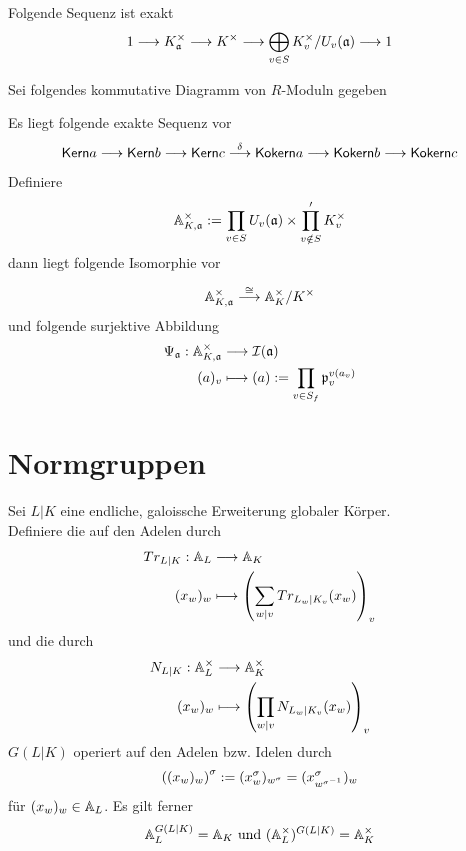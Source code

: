 \Lem{}
Folgende Sequenz ist exakt
\[ 1 \overset{}{\longrightarrow} K_{\mathfrak{a}}^\times \overset{}{\longrightarrow} K^\times \overset{}{\longrightarrow} \bigoplus_{v\in S} K_v^\times/U_v(\mathfrak{a}) \overset{}{\longrightarrow} 1 \]

Sei folgendes kommutative Diagramm von $R$-Moduln gegeben
\begin{center}
\end{center}
Es liegt folgende exakte Sequenz vor
\[ \textsf{Kern} a \overset{}{\longrightarrow} \textsf{Kern} b \overset{}{\longrightarrow} \textsf{Kern} c \overset{\delta}{\longrightarrow} \textsf{Kokern} a \overset{}{\longrightarrow} \textsf{Kokern} b \overset{}{\longrightarrow} \textsf{Kokern} c \]

\Bem{}
Definiere
\[ \mathbb{A}_{K,\mathfrak{a}}^\times := \prod_{v \in S}U_v(\mathfrak{a}) \times \prod'_{v\notin S} K_v^\times \]
dann liegt folgende Isomorphie vor
\[ \mathbb{A}_{K,\mathfrak{a}}^\times \overset{\overset{}{\cong}}{\longrightarrow} \mathbb{A}_K^\times / K^\times \]
und folgende surjektive Abbildung
\begin{align*}
\Psi_{\mathfrak{a}} : \mathbb{A}_{K,\mathfrak{a}}^\times &\overset{}{\longrightarrow} \mathcal{I}(\mathfrak{a})\\
(a)_v & \longmapsto (a) := \prod_{v\in S_f}\mathfrak{p}_v^{v(a_v)}
\end{align*}


\section{Normgruppen}
Sei $L|K$ eine endliche, galoissche Erweiterung globaler Körper.\\
Definiere die  auf den Adelen durch
\begin{align*}
Tr_{L|K} : \mathbb{A}_L & \overset{}{\longrightarrow} \mathbb{A}_K\\
(x_w)_w & \longmapsto \left(\sum_{w |v}Tr_{L_w|K_v}(x_w) \right)_v
\end{align*}
und die  durch
\begin{align*}
N_{L|K} : \mathbb{A}_L^\times & \overset{}{\longrightarrow} \mathbb{A}_K^\times\\
(x_w)_w & \longmapsto \left(\prod_{w |v}N_{L_w|K_v}(x_w) \right)_v
\end{align*}
$G(L|K)$ operiert auf den Adelen bzw. Idelen durch
\[ \left((x_w)_w\right)^\sigma := (x_w^\sigma)_{w^\sigma} = (x_{w^{\sigma^{-1}}}^\sigma)_w \]
für $(x_w)_w \in \mathbb{A}_L$. Es gilt ferner
\[ \mathbb{A}_L^{G(L|K)} = \mathbb{A}_K \text{ und } (\mathbb{A}_L^\times)^{G(L|K)} = \mathbb{A}_K^\times \]

